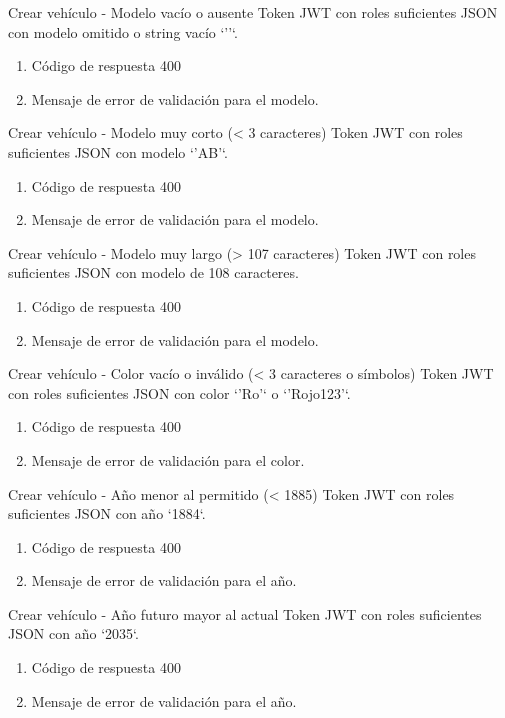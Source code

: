 {Crear vehículo - Modelo vacío o ausente}
{Token JWT con roles suficientes}
{JSON con modelo omitido o string vacío `''`.}
{\begin{enumerate} [leftmargin=*, nosep]
    \item Código de respuesta 400
    \item Mensaje de error de validación para el modelo.
\end{enumerate}}

{Crear vehículo - Modelo muy corto (< 3 caracteres)}
{Token JWT con roles suficientes}
{JSON con modelo `'AB'`.}
{\begin{enumerate} [leftmargin=*, nosep]
    \item Código de respuesta 400
    \item Mensaje de error de validación para el modelo.
\end{enumerate}}

{Crear vehículo - Modelo muy largo (> 107 caracteres)}
{Token JWT con roles suficientes}
{JSON con modelo de 108 caracteres.}
{\begin{enumerate} [leftmargin=*, nosep]
    \item Código de respuesta 400
    \item Mensaje de error de validación para el modelo.
\end{enumerate}}

{Crear vehículo - Color vacío o inválido (< 3 caracteres o símbolos)}
{Token JWT con roles suficientes}
{JSON con color `'Ro'` o `'Rojo123'`.}
{\begin{enumerate} [leftmargin=*, nosep]
    \item Código de respuesta 400
    \item Mensaje de error de validación para el color.
\end{enumerate}}

{Crear vehículo - Año menor al permitido (< 1885)}
{Token JWT con roles suficientes}
{JSON con año `1884`.}
{\begin{enumerate} [leftmargin=*, nosep]
    \item Código de respuesta 400
    \item Mensaje de error de validación para el año.
\end{enumerate}}

{Crear vehículo - Año futuro mayor al actual}
{Token JWT con roles suficientes}
{JSON con año `2035`.}
{\begin{enumerate} [leftmargin=*, nosep]
    \item Código de respuesta 400
    \item Mensaje de error de validación para el año.
\end{enumerate}}

